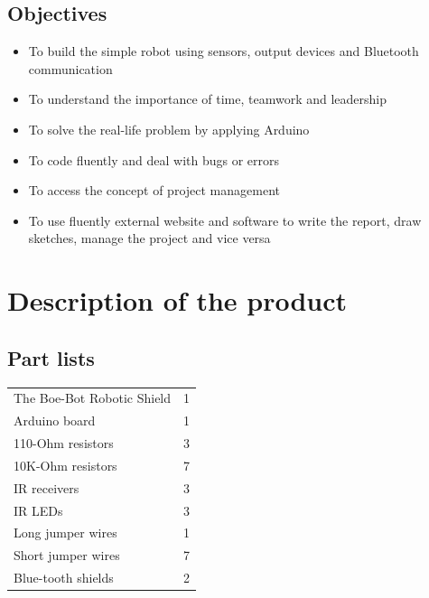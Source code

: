 \documentclass{article}
\begin{document}
\subsection{Objectives}
\begin{itemize}
	\item To build the simple robot using sensors, output devices and Bluetooth communication
	\item To understand the importance of time, teamwork and leadership
	\item To solve the real-life problem by applying Arduino
	\item To code fluently and deal with bugs or errors
	\item To access the concept of project management
	\item To use fluently external website and software to write the report, draw sketches, manage the project and vice versa
\end{itemize}

 
\newpage
\section{Description of the product}
\subsection{Part lists}
\begin{tabular}{ll}
The Boe-Bot Robotic Shield & {1}\\
Arduino board & {1}\\
110-Ohm resistors & {3}\\
10K-Ohm resistors & {7}\\
IR receivers & {3}\\
IR LEDs & {3}\\
Long jumper wires & {1}\\
Short jumper wires & {7}\\
Blue-tooth shields & {2}\\



\end{tabular}

\newpage
\end{document}
